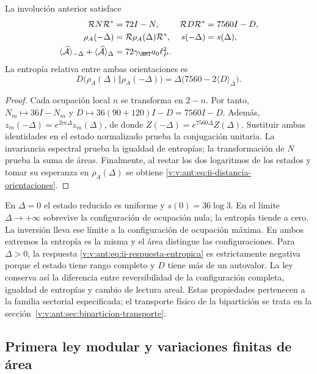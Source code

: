 \begin{theorem}
La involución anterior satisface
\begin{align}
 \mathcal R N\mathcal R^*&=72I-N,&
 \mathcal R D\mathcal R^*&=7560I-D,\\
 \rho_A(-\Delta)&=\mathcal R\rho_A(\Delta)\mathcal R^*,&
 s(-\Delta)&=s(\Delta),
 \label{v:v:ant:eq:ii-inversion-entropia}\\
 \langle\widehat{\mathcal A}\rangle_{-\Delta}
 +\langle\widehat{\mathcal A}\rangle_\Delta
 &=72\gamma_{\HMT}a_0\ell_P^2.&&
 \label{v:v:ant:eq:ii-area-complementaria}
\end{align}
La entropía relativa entre ambas orientaciones es
\begin{equation}
 D\bigl(\rho_A(\Delta)\Vert\rho_A(-\Delta)\bigr)
 =\Delta\bigl(7560-2\langle D\rangle_\Delta\bigr).
 \label{v:v:ant:eq:ii-distancia-orientaciones}
\end{equation}
\end{theorem}
\begin{proof}
Cada ocupación local $n$ se transforma en $2-n$. Por tanto,
$N_m\mapsto36I-N_m$ y
$D\mapsto36(90+120)I-D=7560I-D$.
Además, $z_m(-\Delta)=e^{2m\Delta}z_m(\Delta)$,
de donde $Z(-\Delta)=e^{7560\Delta}Z(\Delta)$.
Sustituir ambas identidades en el estado normalizado prueba la
conjugación unitaria. La invariancia espectral prueba la igualdad
de entropías; la transformación de $N$ prueba la suma de áreas.
Finalmente, al restar los dos logaritmos de los estados y tomar
su esperanza en $\rho_A(\Delta)$ se obtiene
\eqref{v:v:ant:eq:ii-distancia-orientaciones}.
\end{proof}

En $\Delta=0$ el estado reducido es uniforme y
$s(0)=36\log3$. En el límite $\Delta\to+\infty$ sobrevive
la configuración de ocupación nula; la entropía tiende a cero.
La inversión lleva ese límite a la configuración de ocupación máxima.
En ambos extremos la entropía es la misma y el área distingue las
configuraciones. Para $\Delta>0$, la respuesta
\eqref{v:v:ant:eq:ii-respuesta-entropica} es estrictamente negativa porque
el estado tiene rango completo y $D$ tiene más de un autovalor.
La ley conserva así la diferencia entre reversibilidad de la
configuración completa, igualdad de entropías y cambio de lectura areal.
Estas propiedades pertenecen a la familia sectorial especificada;
el transporte físico de la bipartición se trata en
la sección~\ref{v:v:ant:sec:biparticion-transporte}.

\subsection{Primera ley modular y variaciones finitas de área}
\label{v:v:ant:sec:ii-area-ley-modular}

